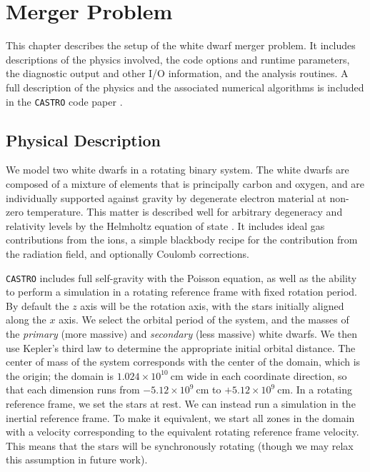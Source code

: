 \documentclass[12pt]{book}
\begin{document}
\chapter{Merger Problem}

This chapter describes the setup of the white dwarf merger problem. It includes descriptions of 
the physics involved, the code options and runtime parameters, the diagnostic output 
and other I/O information, and the analysis routines. A full description of the physics 
and the associated numerical algorithms is included in the \texttt{CASTRO} code paper \cite{castro}.

\section{Physical Description}

We model two white dwarfs in a rotating binary system. The white dwarfs are composed of 
a mixture of elements that is principally carbon and oxygen, and are individually supported 
against gravity by degenerate electron material at non-zero temperature. This matter is described well 
for arbitrary degeneracy and relativity levels by the Helmholtz equation of state \cite{timmes_swesty:2000}.
It includes ideal gas contributions from the ions, a simple blackbody recipe for the contribution from 
the radiation field, and optionally Coulomb corrections. 

\texttt{CASTRO} includes full self-gravity with the Poisson equation, as well as the ability to perform a
simulation in a rotating reference frame with fixed rotation period. By default the $z$ axis will 
be the rotation axis, with the stars initially aligned along the $x$ axis. We select the 
orbital period of the system, and the masses of the \textit{primary} (more massive) and 
\textit{secondary} (less massive) white dwarfs. We then use Kepler's third law to determine the 
appropriate initial orbital distance. The center of mass of the system corresponds with the center 
of the domain, which is the origin; the domain is $1.024 \times 10^{10}\ \text{cm}$ wide in each 
coordinate direction, so that each dimension runs from $-5.12 \times 10^{9}\ \text{cm}$ to 
$+5.12 \times 10^{9}\ \text{cm}$. In a rotating reference frame, we set the stars at rest. 
We can instead run a simulation in the inertial reference frame. To make it equivalent, we
start all zones in the domain with a velocity corresponding to the equivalent rotating 
reference frame velocity. This means that the stars will be synchronously rotating (though we
may relax this assumption in future work).
\end{document}
